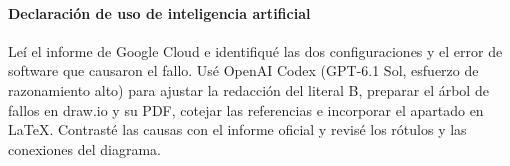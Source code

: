 \paragraph*{Declaración de uso de inteligencia artificial}
Leí el informe de Google Cloud e identifiqué las dos configuraciones y el error de software que causaron el fallo. Usé OpenAI Codex (GPT-6.1 Sol, esfuerzo de razonamiento alto) para ajustar la redacción del literal B, preparar el árbol de fallos en draw.io y su PDF, cotejar las referencias e incorporar el apartado en LaTeX. Contrasté las causas con el informe oficial y revisé los rótulos y las conexiones del diagrama.
